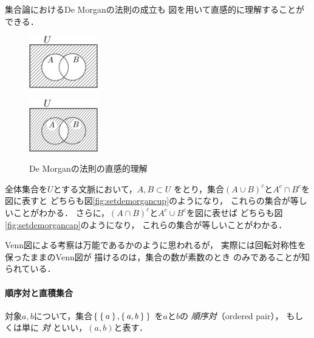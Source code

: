    集合論におけるDe Morganの法則の成立も
   図を用いて直感的に理解することができる．
   \begin{figure}[h]
     \begin{minipage}{0.45\linewidth}
       \centering
       \includegraphics[width=3cm]{inputyou/set/picture/setdemorgancup.pdf}
       \label{fig:setdemorgancup}
     \end{minipage}
     \begin{minipage}{0.45\linewidth}
       \centering
       \includegraphics[width=3cm]{inputyou/set/picture/setdemorgancap.pdf}
       \label{fig:setdemorgancap}
     \end{minipage}
     \caption{De Morganの法則の直感的理解}
     \label{fig:setdemorgan}
   \end{figure}
   
   全体集合を$U$とする文脈において，$A,  B \subset U$
   をとり，集合$(A \cup B)^c$と$A^c \cap B^c$を図に表すと
   どちらも図\ref{fig:setdemorgancup}のようになり，
   これらの集合が等しいことがわかる．
   さらに，$(A \cap B)^c$と$A ^c \cup B^c$を図に表せば
   どちらも図\ref{fig:setdemorgancap}のようになり，
   これらの集合が等しいことがわかる．

   Venn図による考察は万能であるかのように思われるが，
   実際には回転対称性を保ったままのVenn図が
   描けるのは，集合の数が素数のとき
   のみであることが知られている．


   \paragraph{順序対と直積集合}
   対象$a,  b$について，集合$\Set{ \Set{a} ,  \Set{a,  b}}$
   を$a$と$b$の
   \emph{順序対}（ordered pair），
   もしくは単に \emph{対} といい，$(a,b)$と表す．
   
